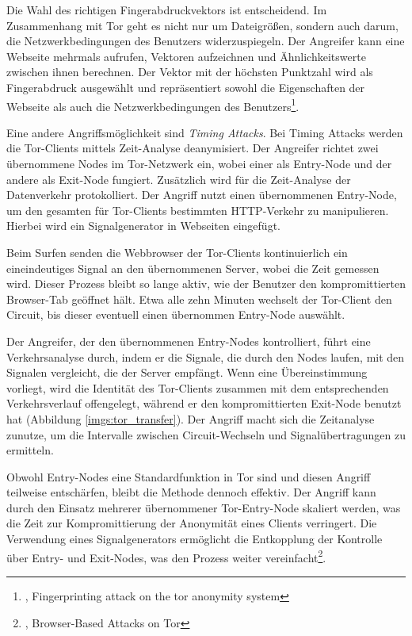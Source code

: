 Die Wahl des richtigen Fingerabdruckvektors ist entscheidend. Im Zusammenhang mit Tor geht es nicht nur um Dateigrößen, sondern auch darum, die Netzwerkbedingungen des Benutzers widerzuspiegeln. Der Angreifer kann eine Webseite mehrmals aufrufen, Vektoren aufzeichnen und Ähnlichkeitswerte zwischen ihnen berechnen. Der Vektor mit der höchsten Punktzahl wird als Fingerabdruck ausgewählt und repräsentiert sowohl die Eigenschaften der Webseite als auch die Netzwerkbedingungen des Benutzers\footnote{\cite{FingerprintingOnTorAttack}, Fingerprinting attack on the tor anonymity system}.

Eine andere Angriffsmöglichkeit sind \textit{Timing Attacks}. Bei Timing Attacks werden die Tor-Clients mittels Zeit-Analyse deanymisiert. Der Angreifer richtet zwei übernommene Nodes im Tor-Netzwerk ein, wobei einer als Entry-Node und der andere als Exit-Node fungiert. Zusätzlich wird für die Zeit-Analyse der Datenverkehr protokolliert. Der Angriff nutzt einen übernommenen Entry-Node, um den gesamten für Tor-Clients bestimmten HTTP-Verkehr zu manipulieren. Hierbei wird ein Signalgenerator in Webseiten eingefügt.

Beim Surfen senden die Webbrowser der Tor-Clients kontinuierlich ein eineindeutiges Signal an den übernommenen Server, wobei die Zeit gemessen wird. Dieser Prozess bleibt so lange aktiv, wie der Benutzer den kompromittierten Browser-Tab geöffnet hält. Etwa alle zehn Minuten wechselt der Tor-Client den Circuit, bis dieser eventuell einen übernommen Entry-Node auswählt.

Der Angreifer, der den übernommenen Entry-Nodes kontrolliert, führt eine Verkehrsanalyse durch, indem er die Signale, die durch den Nodes laufen, mit den Signalen vergleicht, die der Server empfängt. Wenn eine Übereinstimmung vorliegt, wird die Identität des Tor-Clients zusammen mit dem entsprechenden Verkehrsverlauf offengelegt, während er den kompromittierten Exit-Node benutzt hat (Abbildung \ref{imgs:tor_transfer}). Der Angriff macht sich die Zeitanalyse zunutze, um die Intervalle zwischen Circuit-Wechseln und Signalübertragungen zu ermitteln.

Obwohl Entry-Nodes eine Standardfunktion in Tor sind und diesen Angriff teilweise entschärfen, bleibt die Methode dennoch effektiv. Der Angriff kann durch den Einsatz mehrerer übernommener Tor-Entry-Node skaliert werden, was die Zeit zur Kompromittierung der Anonymität eines Clients verringert. Die Verwendung eines Signalgenerators ermöglicht die Entkopplung der Kontrolle über Entry- und Exit-Nodes, was den Prozess weiter vereinfacht\footnote{\cite{BrowserBasedAttacksOnTor}, Browser-Based Attacks on Tor}.
